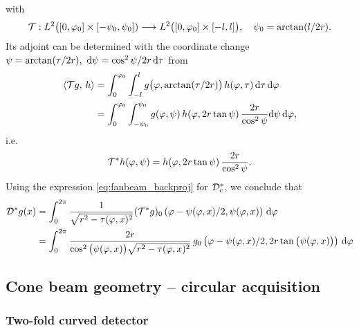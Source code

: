 \documentclass{amsart}
\renewcommand*{\phi}{\varphi}
\begin{document}
%
with
%
\begin{equation*}
 \OPT: L^2\big([0, \phi_0] \times [-\psi_0, \psi_0]) \Lto L^2\big([0, \phi_0] \times [-l, l]\big), \quad \psi_0 = \arctan(l/2r).
\end{equation*}
%
Its adjoint can be determined with the coordinate change $\psi = \arctan(\tau/2r),\ \mathrm{d}\psi = \cos^2\psi / 2r\, \mathrm{d}\tau$ from
%
\begin{align*}
 \INNER{\OPT g}{h} 
 &= \int_0^{\phi_0} \int_{-l}^l g\big(\phi, \arctan(\tau/2r)\big)\, h(\phi, \tau)\, \D\tau\, \D\phi \\
 &= \int_0^{\phi_0} \int_{-\psi_0}^{\psi_0} g(\phi, \psi)\, h(\phi, 2r\tan\psi)\, \frac{2r}{\cos^2\psi} \D\psi\, \D\phi,
\end{align*}
%
i.e.
%
\begin{equation}
 \label{eq:fanflat_curved2flat_adj}
 \DUALOPT h(\phi, \psi) = h(\phi, 2r\tan\psi)\, \frac{2r}{\cos^2\psi}.
\end{equation} 
%
Using the expression \eqref{eq:fanbeam_backproj} for ${\mathcal{D}}_{\mathrm{c}}^*$, we conclude that
%
\begin{align}
 \DUALOPD g(x) 
 &= \int_0^{2\pi} \frac{1}{\sqrt{r^2-\tau(\phi, x)^2}} (\DUALOPT g)_0\left(\phi - \psi(\phi,x)/2, \psi(\phi,x) \right)\, \D\phi 
 \notag \\
 \label{eq:fanflat_backproj}
 &= \int_0^{2\pi} \frac{2r}{\cos^2\big(\psi(\phi,x)\big)\sqrt{r^2-\tau(\phi, x)^2}}\,
 g_0\left(\phi - \psi(\phi,x)/2, 2r \tan\big(\psi(\phi,x)\big) \right)\, \D\phi 
\end{align} 



\subsection{Cone beam geometry -- circular acquisition}

\subsubsection{Two-fold curved detector}
\end{document}
